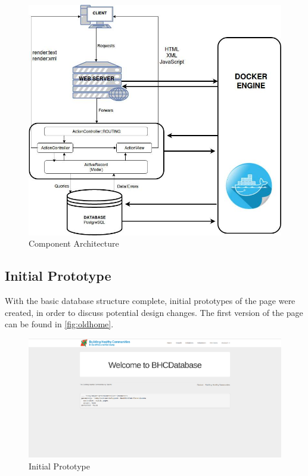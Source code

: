 \documentclass{l3proj}
\begin{document}
\begin{figure}[ht]
\centerline{\includegraphics[width=\textwidth, height=\textheight, keepaspectratio]{component.png}}
\caption{Component Architecture}
\label{fig:ca}
\end{figure}

\subsection{Initial Prototype}
\label{sec:prototype1}

With the basic database structure complete, initial prototypes of the page were created, in order to discuss potential design changes. The first version of the page can be found in \autoref{fig:oldhome}.

\begin{figure}[ht]
\centerline{\includegraphics[width=\textwidth, height=\textheight, keepaspectratio]{oldhome.png}}
\caption{Initial Prototype}
\label{fig:oldhome}
\end{figure}
\end{document}
